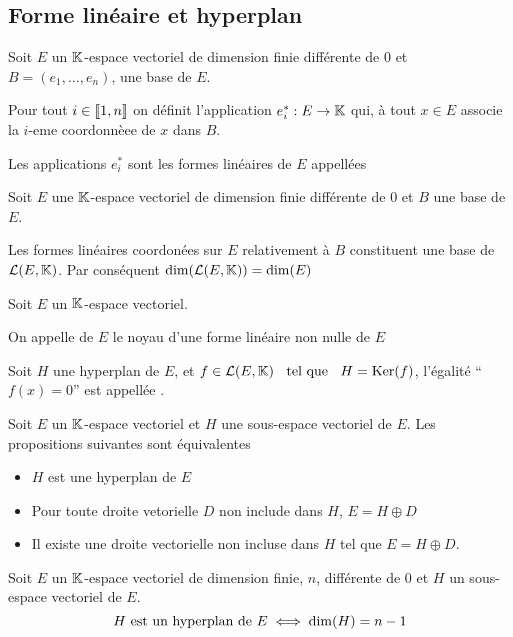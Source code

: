 \subsection{Forme linéaire et hyperplan}

\begin{dfn}
Soit $E$ un $\mathbb{K}$-espace vectoriel de dimension finie différente de $0$
et $B = (e_1, \ldots, e_n)$, une base de $E$.

Pour tout $i \in \llbracket 1, n \rrbracket$ on définit l'application
$e^*_i : E \to \mathbb{K}$ qui, à tout $x \in E$ associe la $i$-eme
coordonnèee de $x$ dans $B$. 

Les applications $e^*_i$ sont les formes linéaires de $E$
appellées 
\end{dfn}

\begin{prp}
Soit $E$ une $\mathbb{K}$-espace vectoriel de dimension finie différente de $0$
et $B$ une base de $E$.

Les formes linéaires coordonées sur $E$ relativement à $B$ constituent
une base de $\operatorname{\mathcal{L}}(E, \mathbb{K})$. Par conséquent $\operatorname{dim}(\operatorname{\mathcal{L}}(E, \mathbb{K})) = \operatorname{dim}(E)$
\end{prp}

\begin{dfn}
Soit $E$ un $\mathbb{K}$-espace vectoriel.

On appelle  de $E$ le noyau d'une forme linéaire non nulle
de $E$

Soit $H$ une hyperplan de $E$, et $f \in \operatorname{\mathcal{L}}(E, \mathbb{K}) \;\;\text{ tel que }\;\; H = \operatorname{Ker}(f)$,
l'égalité ``$f(x) = 0$'' est appellée .
\end{dfn}

\begin{prp}
Soit $E$ un $\mathbb{K}$-espace vectoriel et $H$ une sous-espace vectoriel de
$E$.
Les propositions suivantes sont équivalentes
\begin{itemize}
    \item $H$ est une hyperplan de $E$
    \item Pour toute droite vetorielle $D$ non include dans $H$,
    $E = H \oplus D$
    \item Il existe une droite vectorielle non incluse dans $H$ tel que
    $E = H \oplus D$.
\end{itemize}
\end{prp}

\begin{prp}
Soit $E$ un $\mathbb{K}$-espace vectoriel de dimension finie, $n$,  différente
de $0$ et $H$ un sous-espace vectoriel de $E$.
\[
    H \text{ est un hyperplan de } E \iff \operatorname{dim}(H) = n - 1
\]
\end{prp}

